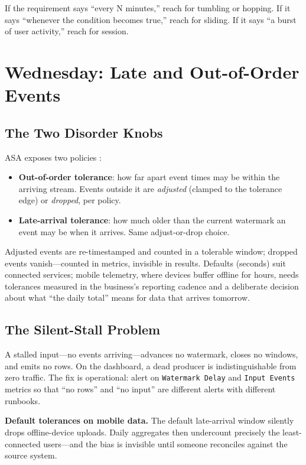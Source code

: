 \begin{tipbox}
If the requirement says ``every N minutes,'' reach for tumbling or hopping. If it says ``whenever the condition becomes true,'' reach for sliding. If it says ``a burst of user activity,'' reach for session.
\end{tipbox}

\section{Wednesday: Late and Out-of-Order Events}

\subsection{The Two Disorder Knobs}
ASA exposes two policies \cite{microsoft2025asaWindowing}:
\begin{itemize}
    \item \textbf{Out-of-order tolerance}: how far apart event times may be within the arriving stream. Events outside it are \emph{adjusted} (clamped to the tolerance edge) or \emph{dropped}, per policy.
    \item \textbf{Late-arrival tolerance}: how much older than the current watermark an event may be when it arrives. Same adjust-or-drop choice.
\end{itemize}
Adjusted events are re-timestamped and counted in a tolerable window; dropped events vanish---counted in metrics, invisible in results. Defaults (seconds) suit connected services; mobile telemetry, where devices buffer offline for hours, needs tolerances measured in the business's reporting cadence and a deliberate decision about what ``the daily total'' means for data that arrives tomorrow.

\subsection{The Silent-Stall Problem}
A stalled input---no events arriving---advances no watermark, closes no windows, and emits no rows. On the dashboard, a dead producer is indistinguishable from zero traffic. The fix is operational: alert on \texttt{Watermark Delay} and \texttt{Input Events} metrics so that ``no rows'' and ``no input'' are different alerts with different runbooks.

\begin{pitfall}
\textbf{Default tolerances on mobile data.} The default late-arrival window silently drops offline-device uploads. Daily aggregates then undercount precisely the least-connected users---and the bias is invisible until someone reconciles against the source system.
\end{pitfall}

